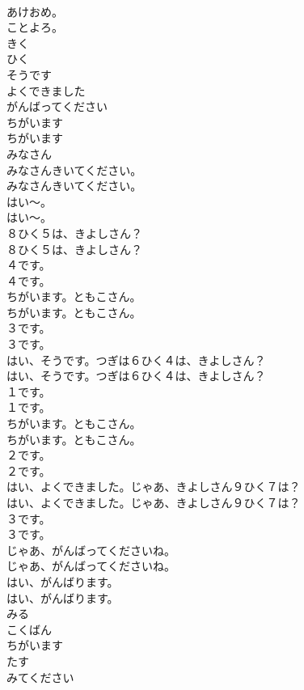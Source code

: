 \documentclass[8pt]{extreport}
\begin{document}
\begin{CJK}{UTF8}{min}
\\	あけおめ。
\\	ことよろ。
\\	きく
\\	ひく
\\	そうです
\\	よくできました
\\	がんばってください
\\	ちがいます
\\	ちがいます
\\	みなさん
\\	みなさんきいてください。	
\\	みなさんきいてください。 
\\	はい〜。	
\\	はい〜。 
\\	８ひく５は、きよしさん？	
\\	８ひく５は、きよしさん？ 
\\	４です。	
\\	４です。 
\\	ちがいます。ともこさん。	
\\	ちがいます。ともこさん。 
\\	３です。	
\\	３です。 
\\	はい、そうです。つぎは６ひく４は、きよしさん？	
\\	はい、そうです。つぎは６ひく４は、きよしさん？ 
\\	１です。	
\\	１です。 
\\	ちがいます。ともこさん。	
\\	ちがいます。ともこさん。 
\\	２です。	
\\	２です。 
\\	はい、よくできました。じゃあ、きよしさん９ひく７は？	
\\	はい、よくできました。じゃあ、きよしさん９ひく７は？ 
\\	３です。	
\\	３です。 
\\	じゃあ、がんばってくださいね。	
\\	じゃあ、がんばってくださいね。 
\\	はい、がんばります。	
\\	はい、がんばります。 
\\	みる
\\	こくばん
\\	ちがいます
\\	たす
\\	みてください

\end{CJK}
\end{document}
